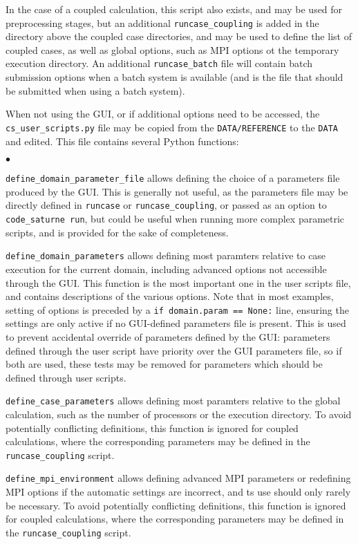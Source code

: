 {{{In the case of a coupled calculation, this script also exists, and
may be used for preprocessing stages, but an additional
\texttt{runcase\_coupling} is added in the directory above the coupled case
directories, and may be used to define the list of coupled cases,
as well as global options, such as MPI options ot the temporary
execution directory. An additional \texttt{runcase\_batch} file will
contain batch submission options when a batch system is available
(and is the file that should be submitted when using a batch system).

When not using the GUI, or if additional options need to be accessed,
the \texttt{cs\_user\_scripts.py} file may be copied from
the \texttt{DATA/REFERENCE} to the \texttt{DATA} and edited.
This file contains several Python functions:

\begin{list}{$\bullet$}{}

\item \texttt{define\_domain\_parameter\_file} allows defining
 the choice of a parameters file produced by the GUI. This is
 generally not useful, as the parameters file may be directly
 defined in \texttt{runcase} or \texttt{runcase\_coupling}, or passed
 as an option to \texttt{code\_saturne run}, but could be useful
 when running more complex parametric scripts, and is provided for
 the sake of completeness.
\item \texttt{define\_domain\_parameters} allows defining
 most paramters relative to case execution for the current
 domain, including advanced options not accessible
 through the GUI. This function is the most important one in the user
 scripts file, and contains descriptions of the various options.
 Note that in most examples, setting of options is preceded by
 a \texttt{if domain.param == None:} line, ensuring the settings
 are only active if no GUI-defined parameters file is present.
 This is used to prevent accidental override of parameters defined
 by the GUI: parameters defined through the user script have priority
 over the GUI parameters file, so if both are used, these tests
 may be removed for parameters which should be defined through
 user scripts.
\item \texttt{define\_case\_parameters} allows defining
 most paramters relative to the global calculation, such as
 the number of processors or the execution directory.
 To avoid potentially conflicting definitions, this function is ignored
 for coupled calculations, where the corresponding parameters
 may be defined in the \texttt{runcase\_coupling} script.
\item \texttt{define\_mpi\_environment} allows defining
 advanced MPI parameters or redefining MPI options if the automatic
 settings are incorrect, and ts use should only rarely be necessary.
 To avoid potentially conflicting definitions, this function is ignored
 for coupled calculations, where the corresponding parameters
 may be defined in the \texttt{runcase\_coupling} script.
\end{list}

}}}
